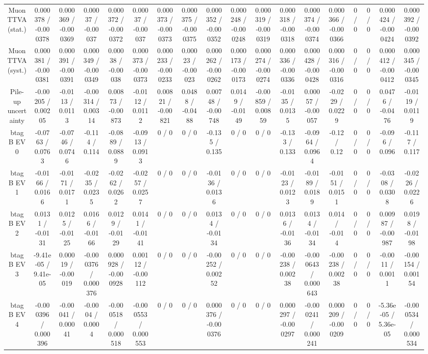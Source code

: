 \documentclass[10pt]{article}
\begin{document}
\begin{table}[htbp]
\begin{center}
\begin{tabular}{|c|c|c|c|c|c|c|c|c|c|c|c|c|c|c|c|c|c|}
  Muon TTVA (stat.) & 0.000378 / -0.000378 & 0.000369 / -0.000369 & 0.00037 / -0.00037 & 0.000372 / -0.000372 & 0.00037 / -0.00037 & 0.000373 / -0.000373 & 0.000375 / -0.000375 & 0.000352 / -0.000352 & 0.000248 / -0.000248 & 0.000319 / -0.000319 & 0.000318 / -0.000318 & 0.000374 / -0.000374 & 0.000366 / -0.000366 & 0 / 0 & 0 / 0 & 0.000424 / -0.000424 & 0.000392 / -0.000392 \\ 
  Muon TTVA (syst.) & 0.000381 / -0.000381 & 0.000391 / -0.000391 & 0.000349 / -0.000349 & 0.00038 / -0.00038 & 0.000373 / -0.000373 & 0.000233 / -0.000233 & 0.00023 / -0.00023 & 0.000262 / -0.000262 & 0.000173 / -0.000173 & 0.000274 / -0.000274 & 0.000336 / -0.000336 & 0.000428 / -0.000428 & 0.000316 / -0.000316 & 0 / 0 & 0 / 0 & 0.000412 / -0.000412 & 0.000345 / -0.000345 \\ 
  Pile-up uncertainty & -0.00205 / 0.00205 & -0.0113 / 0.0113 & -0.00314 / 0.00314 & 0.00873 / -0.00873 & -0.0112 / 0.0112 & 0.00821 / -0.00821 & 0.0488 / -0.0488 & 0.00748 / -0.00748 & 0.0149 / -0.0149 & -0.00859 / 0.00859 & -0.0135 / 0.0135 & 0.00057 / -0.00057 & -0.0229 / 0.0229 & 0 / 0 & 0 / 0 & 0.0476 / -0.0476 & -0.0119 / 0.0119 \\ 
  btag B EV 0 & -0.0763 / 0.0763 & -0.0746 / 0.0746 & -0.114 / 0.114 & -0.0889 / 0.0889 & -0.0913 / 0.0913 & 0 / 0 & 0 / 0 & -0.135 / 0.135 & 0 / 0 & 0 / 0 & -0.133 / 0.133 & -0.0964 / 0.0964 & -0.12 / 0.12 & 0 / 0 & 0 / 0 & -0.096 / 0.096 & -0.117 / 0.117 \\ 
  btag B EV 1 & -0.0166 / 0.0166 & -0.0171 / 0.0171 & -0.0235 / 0.0235 & -0.0262 / 0.0262 & -0.0257 / 0.0257 & 0 / 0 & 0 / 0 & -0.0136 / 0.0136 & 0 / 0 & 0 / 0 & -0.0123 / 0.0123 & -0.0189 / 0.0189 & -0.0151 / 0.0151 & 0 / 0 & 0 / 0 & -0.0308 / 0.0308 & -0.0226 / 0.0226 \\ 
  btag B EV 2 & 0.0131 / -0.0131 & 0.0125 / -0.0125 & 0.0166 / -0.0166 & 0.0129 / -0.0129 & 0.0141 / -0.0141 & 0 / 0 & 0 / 0 & 0.0134 / -0.0134 & 0 / 0 & 0 / 0 & 0.0136 / -0.0136 & 0.0134 / -0.0134 & 0.014 / -0.014 & 0 / 0 & 0 / 0 & 0.00987 / -0.00987 & 0.0198 / -0.0198 \\ 
  btag B EV 3 & -9.41e-05 / 9.41e-05 & 0.00019 / -0.00019 & -0.000376 / 0.000376 & 0.000928 / -0.000928 & 0.00112 / -0.00112 & 0 / 0 & 0 / 0 & -0.00252 / 0.00252 & 0 / 0 & 0 / 0 & -0.00238 / 0.00238 & -0.000643 / 0.000643 & -0.00238 / 0.00238 & 0 / 0 & 0 / 0 & -0.0011 / 0.0011 & -0.00154 / 0.00154 \\ 
  btag B EV 4 & -0.000396 / 0.000396 & -0.00041 / 0.00041 & -0.0004 / 0.0004 & -0.000518 / 0.000518 & -0.000553 / 0.000553 & 0 / 0 & 0 / 0 & 0.000376 / -0.000376 & 0 / 0 & 0 / 0 & 0.000297 / -0.000297 & -0.000241 / 0.000241 & 0.000209 / -0.000209 & 0 / 0 & 0 / 0 & -5.36e-05 / 5.36e-05 & -0.000534 / 0.000534 \\ 

\end{tabular}
\end{center}
\end{table}
\end{document}
